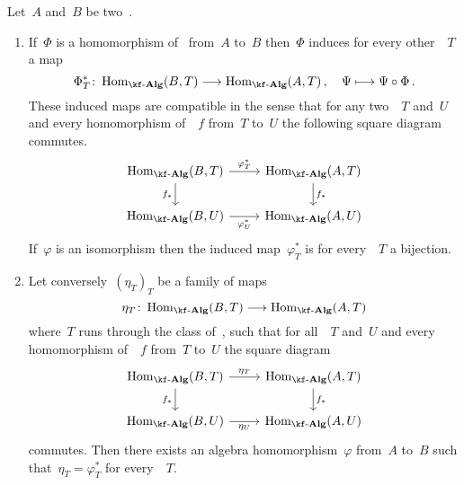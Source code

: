 \begin{proposition}
  \label{yoneda lemma very weak version}
  Let~$A$ and~$B$ be two~{\algebras{$\kf$}}.
  \begin{enumerate}
    \item
      If~$\Phi$ is a homomorphism of~{\algebras{$\kf$}} from~$A$ to~$B$ then~$\Phi$ induces for every other~{\algebra{$\kf$}}~$T$ a map
      \[
        \Phi^*_T
        \colon
        \Hom_{\cAlg{\kf}}(B,T) \to \Hom_{\cAlg{\kf}}(A,T) \,,
        \quad
        \Psi
        \mapsto
        \Psi \circ \Phi \,.
      \]
      These induced maps are compatible in the sense that for any two~{\algebras{$\kf$}}~$T$ and~$U$ and every homomorphism of~{\algebras{$\kf$}}~$f$ from~$T$ to~$U$ the following square diagram commutes.
      \[
        \begin{tikzcd}
          \Hom_{\cAlg{\kf}}(B,T)
          \arrow{r}[above]{\varphi^*_T}
          \arrow{d}[left]{f_*}
          &
          \Hom_{\cAlg{\kf}}(A,T)
          \arrow{d}[right]{f_*}
          \\
          \Hom_{\cAlg{\kf}}(B,U)
          \arrow{r}[below]{\varphi^*_U}
          &
          \Hom_{\cAlg{\kf}}(A,U)
        \end{tikzcd}
      \]
      If~$\varphi$ is an isomorphism then the induced map~$\varphi^*_T$ is for every~{\algebra{$\kf$}}~$T$ a bijection.
    \item
      \label{natural homomorphisms}
      Let conversely~$(\eta_T)_T$ be a family of maps
      \[
        \eta_T
        \colon
        \Hom_{\cAlg{\kf}}(B,T)
        \to
        \Hom_{\cAlg{\kf}}(A,T)
      \]
      where~$T$ runs through the class of~{\algebras{$\kf$}}, such that for all~{\algebras{$\kf$}}~$T$ and~$U$ and every homomorphism of~{\algebras{$\kf$}}~$f$ from~$T$ to~$U$ the square diagram
      \begin{equation}
        \label{natural square}
        \begin{tikzcd}
          \Hom_{\cAlg{\kf}}(B,T)
          \arrow{r}[above]{\eta_T}
          \arrow{d}[left]{f_*}
          &
          \Hom_{\cAlg{\kf}}(A,T)
          \arrow{d}[right]{f_*}
          \\
          \Hom_{\cAlg{\kf}}(B,U)
          \arrow{r}[below]{\eta_U}
          &
          \Hom_{\cAlg{\kf}}(A,U)
        \end{tikzcd}
      \end{equation}
      commutes.
      Then there exists an algebra homomorphism~$\varphi$ from~$A$ to~$B$ such that~$\eta_T = \varphi^*_T$ for every~{\algebra{$\kf$}}~$T$.

\end{enumerate}
\end{proposition}
